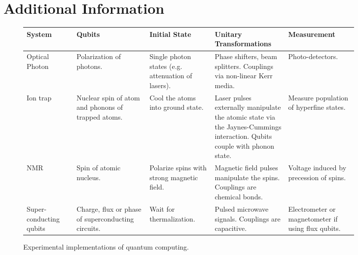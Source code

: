 \documentclass[reqno]{amsart}
\numberwithin{equation}{section}
\numberwithin{figure}{section}
\begin{document}
\section{\\Additional Information}
\begin{figure}[h]
    \begin{tabular}{p{0.13\linewidth}||p{0.19\linewidth}|p{0.17\linewidth}|p{0.19\linewidth}|p{0.18\linewidth}}
        System & Qubits & Initial State & Unitary Transformations & Measurement \\
        \hline\hline
        Optical Photon \cite{KnillLaflammeMilburn2001} & Polarization of photons. & Single photon states (e.g. attenuation of lasers). &  Phase shifters, beam splitters. Couplings via non-linear Kerr media. & Photo-detectors. \\
        \hline
        Ion trap \cite{CiracZoller1995} & Nuclear spin of atom and phonons of trapped atoms. & Cool the atoms into ground state. & Laser pulses externally manipulate the atomic state via the Jaynes-Cummings interaction. Qubits couple with phonon state. & Measure population of hyperfine states. \\
        \hline
        NMR \cite{Lloyd1993} & Spin of atomic nucleus. & Polarize spins with strong magnetic field. & Magnetic field pulses manipulate the spins. Couplings are chemical bonds. & Voltage induced by precession of spins. \\
        \hline
        Super-conducting qubits \cite{Huang2020} & Charge, flux or phase of superconducting circuits. & Wait for thermalization. & Pulsed microwave signals. Couplings are capacitive. & Electrometer or magnetometer if using flux qubits. \\
    \end{tabular}
    \caption{Experimental implementations of quantum computing.}
    \label{fig:ExperimentalImplementations}
\end{figure}
\end{document}
